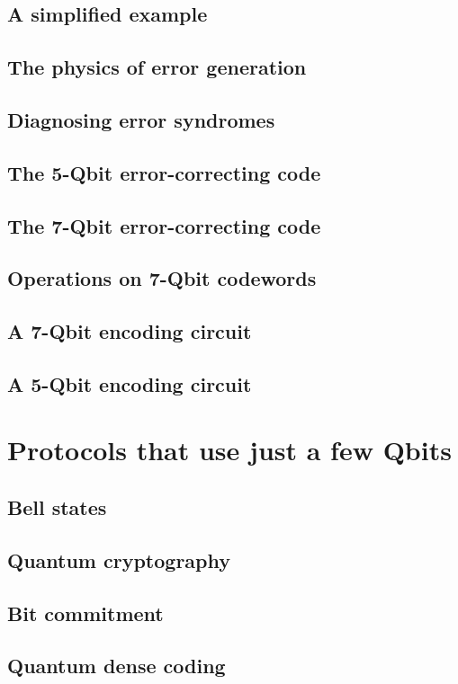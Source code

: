 \documentclass{book}
\theoremstyle{definition}
\begin{document}
\subsection{A simplified example}
\subsection{The physics of error generation}
\subsection{Diagnosing error syndromes}
\subsection{The 5-Qbit error-correcting code}
\subsection{The 7-Qbit error-correcting code}
\subsection{Operations on 7-Qbit codewords}
\subsection{A 7-Qbit encoding circuit}
\subsection{A 5-Qbit encoding circuit}

\newpage

\section{Protocols that use just a few Qbits}

\subsection{Bell states}
\subsection{Quantum cryptography}
\subsection{Bit commitment}
\subsection{Quantum dense coding}
\end{document}
